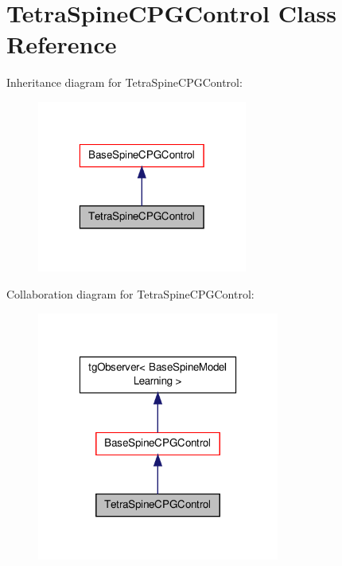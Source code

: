\hypertarget{class_tetra_spine_c_p_g_control}{\section{Tetra\-Spine\-C\-P\-G\-Control Class Reference}
\label{class_tetra_spine_c_p_g_control}
}


Inheritance diagram for Tetra\-Spine\-C\-P\-G\-Control\-:\nopagebreak
\begin{figure}[H]
\begin{center}
\leavevmode
\includegraphics[width=196pt]{class_tetra_spine_c_p_g_control__inherit__graph}
\end{center}
\end{figure}


Collaboration diagram for Tetra\-Spine\-C\-P\-G\-Control\-:\nopagebreak
\begin{figure}[H]
\begin{center}
\leavevmode
\includegraphics[width=226pt]{class_tetra_spine_c_p_g_control__coll__graph}
\end{center}
\end{figure}
